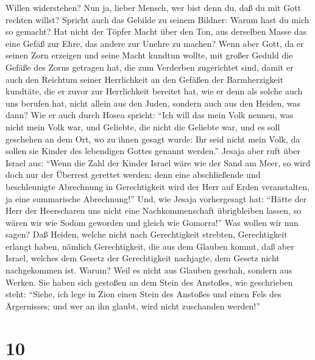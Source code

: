 Willen widerstehen?  Nun ja, lieber Mensch, wer bist denn
du, daß du mit Gott rechten willst? Spricht auch das Gebilde zu seinem
Bildner: Warum hast du mich so gemacht?  Hat nicht der
Töpfer Macht über den Ton, aus derselben Masse das eine Gefäß zur Ehre,
das andere zur Unehre zu machen?  Wenn aber Gott, da er
seinen Zorn erzeigen und seine Macht kundtun wollte, mit großer Geduld
die Gefäße des Zorns getragen hat, die zum Verderben zugerichtet sind,
 damit er auch den Reichtum seiner Herrlichkeit an den
Gefäßen der Barmherzigkeit kundtäte, die er zuvor zur Herrlichkeit
bereitet hat,  wie er denn als solche auch uns berufen
hat, nicht allein aus den Juden, sondern auch aus den Heiden, was dann?
 Wie er auch durch Hosea spricht: ``Ich will das mein
Volk nennen, was nicht mein Volk war, und Geliebte, die nicht die
Geliebte war,  und es soll geschehen an dem Ort, wo zu
ihnen gesagt wurde: Ihr seid nicht mein Volk, da sollen sie Kinder des
lebendigen Gottes genannt werden.''  Jesaja aber ruft
über Israel aus: ``Wenn die Zahl der Kinder Israel wäre wie der Sand am
Meer, so wird doch nur der Überrest gerettet werden; 
denn eine abschließende und beschleunigte Abrechnung in Gerechtigkeit
wird der Herr auf Erden veranstalten, ja eine summarische Abrechnung!''
 Und, wie Jesaja vorhergesagt hat: ``Hätte der Herr der
Heerscharen uns nicht eine Nachkommenschaft übrigbleiben lassen, so
wären wir wie Sodom geworden und gleich wie Gomorra!'' 
Was wollen wir nun sagen? Daß Heiden, welche nicht nach Gerechtigkeit
strebten, Gerechtigkeit erlangt haben, nämlich Gerechtigkeit, die aus
dem Glauben kommt,  daß aber Israel, welches dem Gesetz
der Gerechtigkeit nachjagte, dem Gesetz nicht nachgekommen ist.
 Warum? Weil es nicht aus Glauben geschah, sondern aus
Werken. Sie haben sich gestoßen an dem Stein des Anstoßes,
 wie geschrieben steht: ``Siehe, ich lege in Zion einen
Stein des Anstoßes und einen Fels des Ärgernisses; und wer an ihn
glaubt, wird nicht zuschanden werden!''

\hypertarget{section-9}{%
\section{10}\label{section-9}}

